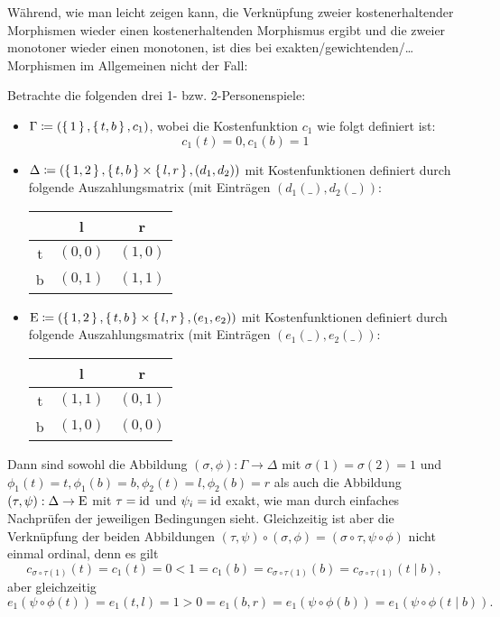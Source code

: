 Während, wie man leicht zeigen kann, die Verknüpfung zweier kostenerhaltender Morphismen wieder einen kostenerhaltenden Morphismus ergibt und die zweier monotoner wieder einen monotonen, ist dies bei exakten/gewichtenden/\dots{} Morphismen im Allgemeinen nicht der Fall: 

\begin{bsp}\label{bsp:GegenbspKompositionVMorphismen}
	Betrachte die folgenden drei 1- bzw. 2-Personenspiele:
	\begin{itemize}
		\item $\Gamma \coloneqq (\set{1}, \set{t, b}, c_1)$, wobei die Kostenfunktion $c_1$ wie folgt definiert ist: 
			\[c_1(t) = 0, c_1(b) = 1\]
		\item $\Delta \coloneqq (\set{1, 2}, \set{t, b} \times \set{l, r}, (d_1, d_2))$ mit Kostenfunktionen definiert durch folgende Auszahlungsmatrix (mit Einträgen $(d_1(\_), d_2(\_))$:
		\begin{center}
				\begin{tabular}{c||c|c}
					& l 		& r 		\\\hline\hline
				t	& $(0,0)$	& $(1,0)$	\\\hline
				b	& $(0,1)$	& $(1,1)$ 
			\end{tabular}
		\end{center}
		\item $\mathrm{E} \coloneqq (\set{1, 2}, \set{t, b} \times \set{l, r}, (e_1, e_2))$ mit Kostenfunktionen definiert durch folgende Auszahlungsmatrix (mit Einträgen $(e_1(\_), e_2(\_))$:
		\begin{center}
			\begin{tabular}{c||c|c}
				& l 		& r 		\\\hline\hline
			t	& $(1,1)$	& $(0,1)$	\\\hline
			b	& $(1,0)$	& $(0,0)$ 
			\end{tabular}
		\end{center}
	\end{itemize}
	Dann sind sowohl die Abbildung $(\sigma, \phi): \Gamma \to \Delta$ mit $\sigma(1) = \sigma(2) = 1$ und $\phi_1(t) = t, \phi_1(b) = b, \phi_2(t) = l, \phi_2(b) = r$ als auch die Abbildung $(\tau, \psi): \Delta \to \mathrm{E}$ mit $\tau = \mathrm{id}$ und $\psi_i = \mathrm{id}$ exakt, wie man durch einfaches Nachprüfen der jeweiligen Bedingungen sieht. Gleichzeitig ist aber die Verknüpfung der beiden Abbildungen $(\tau, \psi)\circ(\sigma, \phi) = (\sigma\circ\tau, \psi\circ\phi)$ nicht einmal ordinal, denn es gilt
		\[c_{\sigma\circ\tau(1)}(t) = c_1(t) = 0 < 1 = c_1(b) = c_{\sigma\circ\tau(1)}(b) = c_{\sigma\circ\tau(1)}(t \mid b),\]
	aber gleichzeitig
		\[e_1(\psi\circ\phi(t)) = e_1(t,l) = 1 > 0 = e_1(b,r) = e_1(\psi\circ\phi(b)) = e_1(\psi\circ\phi(t \mid b)).\]
\end{bsp}

